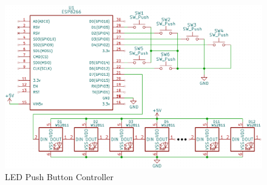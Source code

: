 \begin{figure}[H]
  \centering
    \includegraphics[scale=0.14]{../Images/lpb_schematic.png}
  \caption{LED Push Button Controller}
  \label{fig:lpb_schematic}
\end{figure}
